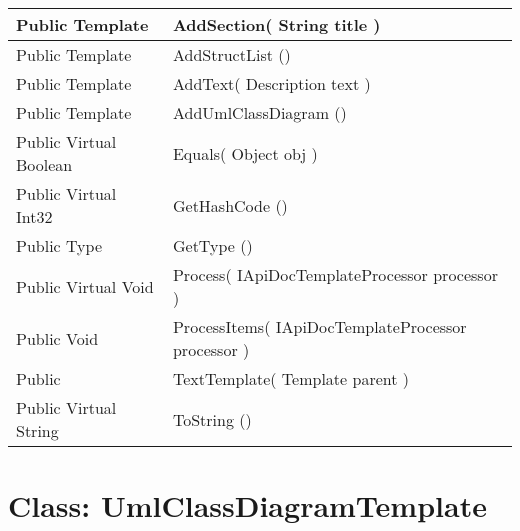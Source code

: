 \documentclass[11pt, oneside, a4paper]{book}
\begin{document}
\begin{center}
\begin{tabular}{| p{3cm} | p{12cm} | }
\hline
 Public  Template &  AddSection(\hypertarget{SoftwareEngineeringTools.{}Documentation.{}TextTemplate.{}AddSection\_String}{} String  title  )\\
\hline
 Public  Template &  AddStructList ()\hypertarget{SoftwareEngineeringTools.{}Documentation.{}TextTemplate.{}AddStructList}{}\\
\hline
 Public  Template &  AddText(\hypertarget{SoftwareEngineeringTools.{}Documentation.{}TextTemplate.{}AddText\_Description}{} Description  text  )\\
\hline
 Public  Template &  AddUmlClassDiagram ()\hypertarget{SoftwareEngineeringTools.{}Documentation.{}TextTemplate.{}AddUmlClassDiagram}{}\\
\hline
 Public  Virtual  Boolean &  Equals(\hypertarget{SoftwareEngineeringTools.{}Documentation.{}TextTemplate.{}Equals\_Object}{} Object  obj  )\\
\hline
 Public  Virtual  Int32 &  GetHashCode ()\hypertarget{SoftwareEngineeringTools.{}Documentation.{}TextTemplate.{}GetHashCode}{}\\
\hline
 Public  Type &  GetType ()\hypertarget{SoftwareEngineeringTools.{}Documentation.{}TextTemplate.{}GetType}{}\\
\hline
 Public  Virtual  Void &  Process(\hypertarget{SoftwareEngineeringTools.{}Documentation.{}TextTemplate.{}Process\_IApiDocTemplateProcessor}{} IApiDocTemplateProcessor  processor  )\\
\hline
 Public  Void &  ProcessItems(\hypertarget{SoftwareEngineeringTools.{}Documentation.{}TextTemplate.{}ProcessItems\_IApiDocTemplateProcessor}{} IApiDocTemplateProcessor  processor  )\\
\hline
 Public  &  TextTemplate(\hypertarget{SoftwareEngineeringTools.{}Documentation.{}TextTemplate.{}TextTemplate\_Template}{} Template  parent  )\\
\hline
 Public  Virtual  String &  ToString ()\hypertarget{SoftwareEngineeringTools.{}Documentation.{}TextTemplate.{}ToString}{}\\
\hline
\end{tabular}
\end{center}
 


\hypertarget{SoftwareEngineeringTools.{}Documentation.{}UmlClassDiagramTemplate}{}
\section{Class: UmlClassDiagramTemplate}
\end{document}
